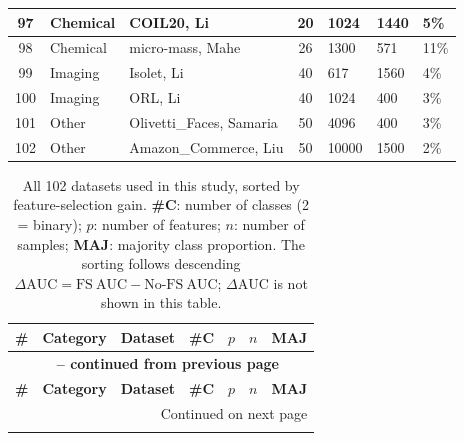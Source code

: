 \documentclass[preprint,12pt,authoryear]{elsarticle}
\begin{document}
{{\begin{longtable}{|c|p{1.9cm}|p{6.7cm}|c|p{0.75cm}|p{0.75cm}|p{0.75cm}|}
97  & Chemical   & COIL20, Li \citeyearpar{li2017feature}                       & 20 & 1024  & 1440 & 5\%  \\ \hline
98  & Chemical   & micro-mass, Mahe \citeyearpar{mahe2014automatic}               & 26 & 1300  & 571  & 11\% \\ \hline
99  & Imaging    & Isolet, Li \citeyearpar{li2017feature}                       & 40 & 617   & 1560 & 4\%  \\
100 & Imaging    & ORL, Li \citeyearpar{li2017feature}                          & 40 & 1024  & 400  & 3\%  \\ \hline
101 & Other      & Olivetti\_Faces, Samaria \citeyearpar{samaria1994parameterisation} & 50 & 4096  & 400  & 3\%  \\
102 & Other      & Amazon\_Commerce, Liu \citeyearpar{amazon_commerce_reviews_215}& 50 & 10000 & 1500 & 2\%  \\

\end{longtable}

{\footnotesize
\begin{longtable}{@{}r p{1.9cm} p{6.7cm} r r r r@{}}
\caption{All 102 datasets used in this study, sorted by feature-selection gain. \textbf{\#C}: number of classes (2 = binary); \textbf{$p$}: number of features; \textbf{$n$}: number of samples; \textbf{MAJ}: majority class proportion. The sorting follows descending $\Delta\mathrm{AUC}=\mathrm{FS\ AUC}-\mathrm{No\text{-}FS\ AUC}$; $\Delta\mathrm{AUC}$ is not shown in this table.}
\label{tab:all_datasets} \\
\toprule
\textbf{\#} & \textbf{Category} & \textbf{Dataset} & \textbf{\#C} & \textbf{$p$} & \textbf{$n$} & \textbf{MAJ} \\
\midrule
\endfirsthead
\multicolumn{7}{c}{{\bfseries \tablename\ \thetable{} -- continued from previous page}} \\
\toprule
\textbf{\#} & \textbf{Category} & \textbf{Dataset} & \textbf{\#C} & \textbf{$p$} & \textbf{$n$} & \textbf{MAJ} \\
\midrule
\endhead
\midrule
\multicolumn{7}{r}{{Continued on next page}} \\
\endfoot
\bottomrule
\endlastfoot


\end{longtable}}}}
\end{document}
